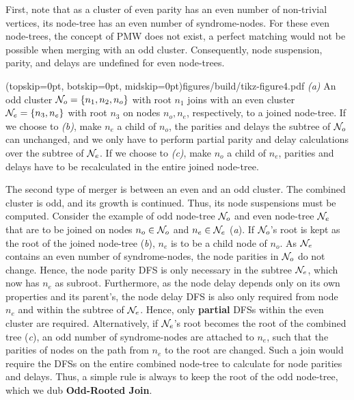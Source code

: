 First, note that as a cluster of even parity has an even number of non-trivial vertices, its node-tree has an even number of syndrome-nodes. For these even node-trees, the concept of PMW does not exist, a perfect matching would not be possible when merging with an odd cluster. Consequently, node suspension, parity, and delays are undefined for even node-trees. 

\Figure[hbt](topskip=0pt, botskip=0pt, midskip=0pt){figures/build/tikz-figure4.pdf}{
    \emph{(a)} An odd cluster $\mathcal{N}_o=\{n_1, n_2, n_o\}$ with root $n_1$ joins with an even cluster $\mathcal{N}_e=\{n_3, n_e\}$ with root $n_3$ on nodes $n_o, n_e$, respectively, to a joined node-tree. If we choose to \emph{(b)}, make $n_e$ a child of $n_o$, the parities and delays the subtree of $\mathcal{N}_o$ can unchanged, and we only have to perform partial parity and delay calculations over the subtree of $\mathcal{N}_e$. If we choose to \emph{(c)}, make $n_o$ a child of $n_e$, parities and delays have to be recalculated in the entire joined node-tree. \label{fig4}}

The second type of merger is between an even and an odd cluster. The combined cluster is odd, and its growth is continued. Thus, its node suspensions must be computed. Consider the example of odd node-tree $\mathcal{N}_o$ and even node-tree $\mathcal{N}_e$ that are to be joined on nodes $n_o\in \mathcal{N}_o$ and $n_e \in \mathcal{N}_e$ (\emph{a}). If $\mathcal{N}_o$'s root is kept as the root of the joined node-tree (\emph{b}), $n_e$ is to be a child node of $n_o$. As $\mathcal{N}_e$ contains an even number of syndrome-nodes, the node parities in $\mathcal{N}_o$ do not change. Hence, the node parity DFS is only necessary in the subtree $\mathcal{N}_e$, which now has $n_e$ as subroot. Furthermore, as the node delay depends only on its own properties and its parent's, the node delay DFS is also only required from node $n_e$ and within the subtree of $\mathcal{N}_e$. Hence, only \textbf{partial} DFSs within the even cluster are required. %
Alternatively, if $\mathcal{N}_e$'s root becomes the root of the combined tree (\emph{c}), an odd number of syndrome-nodes are attached to $n_e$, such that the parities of nodes on the path from $n_e$ to the root are changed. Such a join would require the DFSs on the entire combined node-tree to calculate for node parities and delays. Thus, a simple rule is always to keep the root of the odd node-tree, which we dub \textbf{Odd-Rooted Join}.

